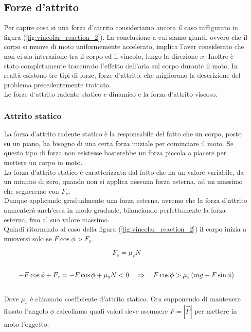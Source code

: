 \subsection{Forze d'attrito}
Per capire cosa si una forza d'attrito consideriamo ancora il caso raffigurato
in figura (\ref{fig:vincolar_reaction_2}). La conclusione a cui siamo
giunti, ovvero che il corpo si
muove di moto uniformemente accelerato, implica l'aver considerato che non ci
sia interazione tra il corpo ed il vincolo, lungo la direzione $x$.
Inoltre è stato completamente trascurato l'effetto dell'aria sul corpo
durante il moto.
In realtà esistono tre tipi di forze, forze d'attrito, che migliorano la
descrizione del problema precedentemente trattato.\\
Le forze d'attrito radente statico e dinamico e la forza d'attrito viscoso.
\subsubsection{Attrito statico}
La forza d'attrito radente statico è la responsabile del fatto che un corpo,
posto su un piano, ha bisogno di una certa forza iniziale per cominciare il
moto. Se questo tipo di forza non esistesse basterebbe un forza piccola a
piacere per mettere un corpo in moto.\\
La forza d'attrito statico è caratterizzata dal fatto che ha un valore
variabile, da un minimo di zero, quando non si applica nessuna forza esterna,
ad un massimo che segneremo con $F_s$.
\\Dunque applicando gradualmente una forza esterna, avremo che la forza
d'attrito aumenterà anch'essa in modo graduale, bilanciando perfettamente
la forza esterna, fino al suo valore massimo.\\
Quindi ritornando al caso della figura (\ref{fig:vincolar_reaction_2})
il corpo inizia a muoversi solo se $F\cos\phi > F_s$.

\begin{equation}
    F_s = \mu_sN
\label{eq:forces:static}
\end{equation}
\\
\begin{equation}
    -F\cos\phi + F_s = -F\cos\phi + \mu_s N < 0\quad\Rightarrow\quad F\cos\phi >
    \mu_s\left( mg - F\sin\phi\right)
\end{equation}
\\
Dove $\mu_s$ è chiamato coefficiente d'attrito statico.
Ora supponendo di mantenere fissato l'angolo $\phi$ calcoliamo quali
valori deve assumere $F = \left|\vec F\right|$ per mettere in moto l'oggetto.

